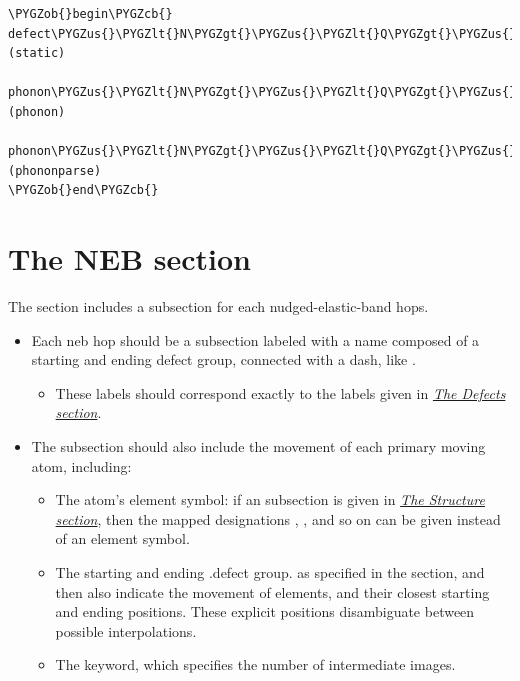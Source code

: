 \documentclass[letterpaper,10pt,english]{sphinxmanual}
\def\PYGZus{\char`\_}
\def\PYGZob{\char`\{}
\def\PYGZcb{\char`\}}
\def\PYGZlt{\char`\<}
\def\PYGZgt{\char`\>}
\begin{document}
\begin{Verbatim}[commandchars=\\\{\}]
\PYGZob{}begin\PYGZcb{}
defect\PYGZus{}\PYGZlt{}N\PYGZgt{}\PYGZus{}\PYGZlt{}Q\PYGZgt{}\PYGZus{}stat (static)
    phonon\PYGZus{}\PYGZlt{}N\PYGZgt{}\PYGZus{}\PYGZlt{}Q\PYGZgt{}\PYGZus{}\PYGZlt{}P\PYGZgt{} (phonon)
        phonon\PYGZus{}\PYGZlt{}N\PYGZgt{}\PYGZus{}\PYGZlt{}Q\PYGZgt{}\PYGZus{}\PYGZlt{}P\PYGZgt{}\PYGZus{}parse (phononparse)
\PYGZob{}end\PYGZcb{}
\end{Verbatim}


\section{The NEB section}
\label{3_1_6_neb:the-neb-section}\label{3_1_6_neb::doc}
The  section includes a subsection for each nudged-elastic-band hops.
\begin{itemize}
\item {} 
Each neb hop should be a subsection labeled with a name composed of a starting and ending defect group, connected with a dash, like .
\begin{itemize}
\item {} 
These labels should correspond exactly to the labels given in {\hyperref[3_1_5_defects::doc]{\emph{The Defects section}}}.

\end{itemize}

\item {} 
The subsection should also include the movement of each primary moving atom, including:
\begin{itemize}
\item {} 
The atom's element symbol: if an  subsection is given in {\hyperref[3_1_1_structure::doc]{\emph{The Structure section}}}, then the mapped designations , , and so on can be given instead of an element symbol.

\item {} 
The starting and ending .defect group. as specified in the  section, and then also indicate the movement of elements, and their closest starting and ending positions. These explicit positions disambiguate between possible interpolations.

\item {} 
The  keyword, which specifies the number of intermediate images.

\end{itemize}

\end{itemize}
\end{document}
